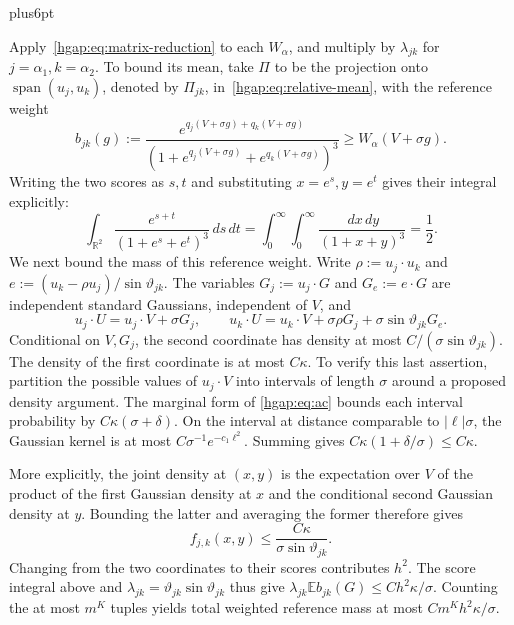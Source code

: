 \documentclass[11pt,letterpaper,twoside,leqno]{article}
\makeatletter
\theoremstyle{bookplain}
\theoremstyle{bookremark}
\renewenvironment{proof}[1][\proofname]{\par
  \pushQED{\qed}\normalfont\topsep6pt plus6pt\relax
  \trivlist\item[\hskip\labelsep\bfseries #1\@addpunct{.}]\ignorespaces
}{\popQED\endtrivlist\@endpefalse}
\newcommand{\E}{\mathbb E}
\newcommand{\R}{\mathbb R}
\newcommand{\dd}{\,d}
\makeatother
\begin{document}
\begin{proof}
Apply~\eqref{hgap:eq:matrix-reduction} to each $W_\alpha$, and multiply
by $\lambda_{jk}$ for $j=\alpha_1,k=\alpha_2$.
To bound its mean, take $\Pi$ to be the projection onto
$\operatorname{span}(u_j,u_k)$, denoted by $\Pi_{jk}$,
in~\eqref{hgap:eq:relative-mean}, with the reference weight
\[
 b_{jk}(g):=\frac{e^{q_j(V+\sigma g)+q_k(V+\sigma g)}}
                  {(1+e^{q_j(V+\sigma g)}+e^{q_k(V+\sigma g)})^3}
                  \ge W_\alpha(V+\sigma g).
\]
Writing the two scores as $s,t$ and substituting $x=e^s,y=e^t$
gives their integral explicitly:
\[
 \int_{\R^2}\frac{e^{s+t}}{(1+e^s+e^t)^3}\dd s\dd t
 =\int_0^\infty\int_0^\infty\frac{\dd x\dd y}{(1+x+y)^3}
 =\frac12.
\]
We next bound the mass of this reference weight. Write
$\rho:=u_j\cdot u_k$ and
$e:=(u_k-\rho u_j)/\sin\vartheta_{jk}$.
The variables $G_j:=u_j\cdot G$ and $G_e:=e\cdot G$ are independent
standard Gaussians, independent of $V$, and
\[
 u_j\cdot U=u_j\cdot V+\sigma G_j,\qquad
 u_k\cdot U=u_k\cdot V+\sigma\rho G_j
                           +\sigma\sin\vartheta_{jk}G_e.
\]
Conditional on $V,G_j$, the second coordinate has density at most
$C/(\sigma\sin\vartheta_{jk})$. The density of the first coordinate
is at most $C\kappa$. To verify this last assertion, partition the
possible values of $u_j\cdot V$ into intervals of length $\sigma$
around a proposed density argument. The marginal form of
\eqref{hgap:eq:ac} bounds each interval probability by
$C\kappa(\sigma+\delta)$. On the interval at distance comparable
to $|\ell|\sigma$, the Gaussian kernel is at most
$C\sigma^{-1}e^{-c_1\ell^2}$. Summing gives
$C\kappa(1+\delta/\sigma)\le C\kappa$.

More explicitly, the joint density at $(x,y)$ is the expectation over
$V$ of the product of the first Gaussian density at $x$ and the
conditional second Gaussian density at $y$. Bounding the latter and
averaging the former therefore gives
\[
 f_{j,k}(x,y)\le\frac{C\kappa}{\sigma\sin\vartheta_{jk}}.
\]
Changing from the two coordinates to their scores contributes $h^2$.
The score integral above and
$\lambda_{jk}=\vartheta_{jk}\sin\vartheta_{jk}$ thus give
$\lambda_{jk}\E b_{jk}(G)\le Ch^2\kappa/\sigma$.
Counting the at most $m^K$ tuples yields total weighted reference
mass at most $Cm^Kh^2\kappa/\sigma$.


\end{proof}
\end{document}

